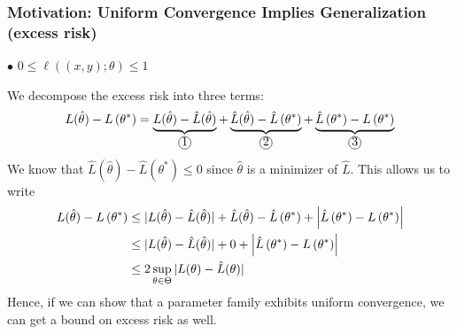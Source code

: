 \documentclass{article}
\newcommand*\circled[1]{\tikz[baseline=(char.base)]{
    \node[shape=circle, draw, inner sep=0.1pt, 
        minimum height=5pt] (char) {\vphantom{1g}#1};}}
\begin{document}
\subsubsection{Motivation: Uniform Convergence Implies Generalization (excess risk)}
$\bullet$  $0 \leq \ell((x, y) ; \theta) \leq 1$

We decompose the excess risk into three terms:
\begin{align*}
L(\hat{\theta})-L\left(\theta^{*}\right)=\underbrace{L(\hat{\theta})-\hat{L}(\hat{\theta})}_{\circled{1}}+\underbrace{\hat{L}(\hat{\theta})-\hat{L}\left(\theta^{*}\right)}_{\circled{2}}+\underbrace{\hat{L}\left(\theta^{*}\right)-L\left(\theta^{*}\right)}_{\circled{3}}
\end{align*}
We know that $\hat{L}(\hat{\theta})-\hat{L}\left(\theta^{*}\right) \leq 0$ since $\hat{\theta}$ is a minimizer of $\hat{L}$. This allows us to write
\begin{align}
L(\hat{\theta})-L\left(\theta^{*}\right) & \leq|L(\hat{\theta})-\hat{L}(\hat{\theta})|+\hat{L}(\hat{\theta})-\hat{L}\left(\theta^{*}\right)+\left|\hat{L}\left(\theta^{*}\right)-L\left(\theta^{*}\right)\right| \nonumber\\ 
& \leq|L(\hat{\theta})-\hat{L}(\hat{\theta})|+0+\left|\hat{L}\left(\theta^{*}\right)-L\left(\theta^{*}\right)\right| \nonumber\\ 
& \leq 2 \sup _{\theta \in \Theta}|L(\theta)-\hat{L}(\theta)|\label{eq:decomp}
\end{align}
Hence, if we can show that a parameter family exhibits uniform convergence, we can get a bound on excess risk as well.
\end{document}
